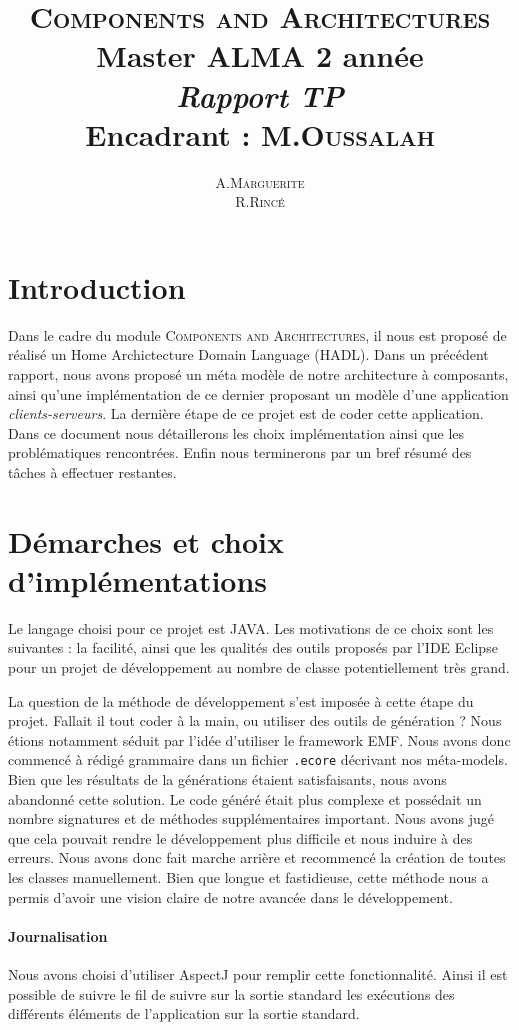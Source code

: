\documentclass[12pt]{article}
\title{ {\huge \textsc{Components and Architectures}} \\  Master ALMA 2\up{eme} année  \\ \emph{Rapport TP}\\{\small Encadrant :  M.\textsc{Oussalah}}}
\author{A.\textsc{Marguerite} \\ R.\textsc{Rincé}}
\begin{document}
\maketitle
\renewcommand{\labelitemi}{$\bullet$} 



\section{Introduction}\label{sec:intro}
Dans le cadre du module \textsc{Components and Architectures}, il nous est proposé de réalisé un Home Archictecture Domain Language (HADL). Dans un précédent rapport, nous avons proposé un méta modèle de notre architecture à composants, ainsi qu'une implémentation de ce dernier proposant un modèle d'une application \textit{clients-serveurs}. La dernière étape de ce projet est de coder cette application. Dans ce document nous détaillerons les choix implémentation ainsi que les problématiques rencontrées. Enfin nous terminerons par un bref résumé des tâches à effectuer restantes.
\section{Démarches et choix d'implémentations}\label{sec:pblm}
Le langage choisi pour ce projet est JAVA. Les motivations de ce choix sont les suivantes : la facilité, ainsi que les qualités des outils proposés par l'IDE Eclipse pour un projet de développement au nombre de classe potentiellement très grand. 

La question de la méthode de développement s'est imposée à cette étape du projet. Fallait il tout coder à la main, ou utiliser des outils de génération ? Nous étions notamment séduit par l'idée d'utiliser le framework EMF. Nous avons donc commencé à rédigé grammaire dans un fichier \verb+.ecore+ décrivant nos méta-models. Bien que les résultats de la générations étaient satisfaisants, nous avons abandonné cette solution. Le code généré était plus complexe et possédait un nombre signatures et de méthodes supplémentaires important. Nous avons jugé que cela pouvait rendre le développement plus difficile et nous induire  à des erreurs. Nous avons donc fait marche arrière et recommencé la création de toutes les classes manuellement. Bien que longue et fastidieuse, cette méthode nous a permis d'avoir une vision claire de notre avancée dans le développement.

\paragraph{Journalisation}
Nous avons choisi d'utiliser AspectJ pour remplir cette fonctionnalité.  Ainsi il est possible de suivre le fil de suivre sur la sortie standard les exécutions des différents éléments de l'application sur la sortie standard. 
\end{document}
